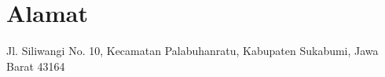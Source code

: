 


\section{Alamat}

Jl. Siliwangi No. 10, Kecamatan Palabuhanratu, Kabupaten Sukabumi, Jawa Barat 43164



